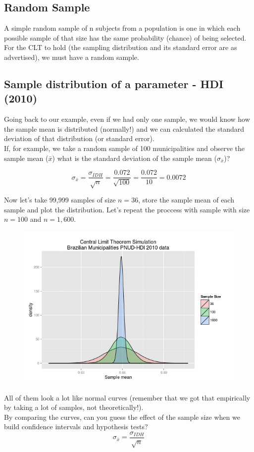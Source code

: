 \documentclass[11pt]{article}
\begin{document}
	\subsection*{Random Sample}
	A simple random sample of n subjects from a population is 
one in which each possible sample of that size has the same 
probability (chance) of being selected.
\newline\\
For the CLT to hold (the sampling distribution and its 
standard error are as advertised), we must have a random 
sample.

	\subsection*{Sample distribution of a parameter - HDI (2010)}
Going back to our example, even if we had only one sample, we would know how the sample mean is distributed (normally!) and we can calculated the standard deviation of that distribution (or standard error).
	\newline\\
If, for example, we take a random sample of 100 municipalities and observe the sample mean ($\bar{x}$) what is the standard deviation of the sample mean ($\sigma_{\bar{x}}$)?

\[\sigma_{\bar{x}} = \frac{\sigma_{IDH}}{\sqrt{n}} = \frac{0.072}{\sqrt{100}} = \frac{0.072}{10} = 0.0072\]

	Now let's take 99,999 samples of size $n=36$, store the sample mean of each sample and plot the distribution. Let's repeat the proccess with sample with size $n=100$ and $n=1,600$.

	\begin{figure}[htp]
\centering
\includegraphics[scale=0.50]{clt_xbar_dist.png}
\caption{}
\label{}
\end{figure}

	All of them look a lot like normal curves (remember that we got that empirically by taking a lot of samples, not theoretically!).
	\newline\\
	By comparing the curves, can you guess the effect of the sample size when we build confidence intervals and hypothesis tests?	
\[\sigma_{\bar{x}} = \frac{\sigma_{IDH}}{\sqrt{n}}\]
\end{document}
